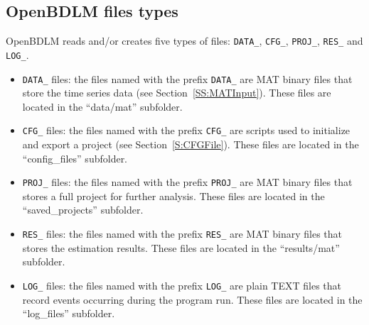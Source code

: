 \subsection{OpenBDLM files types}
OpenBDLM reads and/or creates five types of files: \lstinline[basicstyle = \mlttfamily \small]!DATA_!, \lstinline[basicstyle = \mlttfamily \small ]!CFG_!, \lstinline[basicstyle = \mlttfamily \small ]!PROJ_!, \lstinline[basicstyle = \mlttfamily \small ]!RES_! and \lstinline[basicstyle = \mlttfamily \small ]!LOG_!.
\begin{itemize}
    \item \lstinline[basicstyle = \mlttfamily \small ]!DATA_! files: the files named with the prefix \lstinline[basicstyle = \mlttfamily \small ]!DATA_! are \MATLAB{} MAT binary files that store the time series data (see Section~\ref{SS:MATInput}). These files are located in the ``data/mat'' subfolder.
    \item  \lstinline[basicstyle = \mlttfamily \small ]!CFG_! files: the files named with the prefix \lstinline[basicstyle = \mlttfamily \small ]!CFG_! are  \MATLAB{} scripts used to initialize and export a project (see Section~\ref{S:CFGFile}). These files are located in the ``config\_files'' subfolder.
    \item  \lstinline[basicstyle = \mlttfamily \small ]!PROJ_! files: the files named with the prefix \lstinline[basicstyle = \mlttfamily \small ]!PROJ_! are \MATLAB{} MAT binary files that stores a full project for further analysis. These files are located in the ``saved\_projects'' subfolder.
    \item \lstinline[basicstyle = \mlttfamily \small ]!RES_!  files: the files named with the prefix \lstinline[basicstyle = \mlttfamily \small ]!RES_! are \MATLAB{} MAT binary files that stores the estimation results. These files are located in the ``results/mat'' subfolder.
    \item \lstinline[basicstyle = \mlttfamily \small ]!LOG_! files: the files named with the prefix \lstinline[basicstyle = \mlttfamily \small ]!LOG_! are plain TEXT files that record events occurring during the program run. These files are located in the ``log\_files'' subfolder.
\end{itemize}

